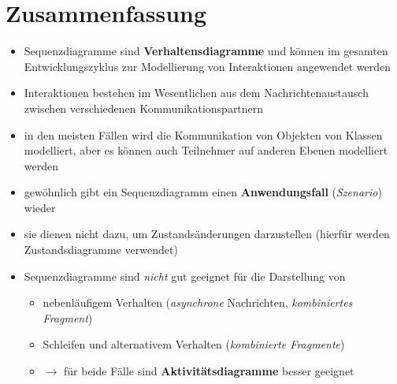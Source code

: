 \section{Zusammenfassung}


\begin{itemize}
    \item Sequenzdiagramme sind \textbf{Verhaltensdiagramme}
    und können im gesamten Entwicklungszyklus zur Modellierung von Interaktionen angewendet werden
    \item Interaktionen bestehen im Wesentlichen aus dem Nachrichtenaustausch zwischen verschiedenen Kommunikationspartnern
    \item in den meisten Fällen wird die Kommunikation von Objekten von Klassen modelliert, aber es können auch Teilnehmer auf anderen Ebenen modelliert werden
    \item gewöhnlich gibt ein Sequenzdiagramm einen \textbf{Anwendungsfall} (\textit{Szenario}) wieder
    \item sie dienen nicht dazu, um Zustandsänderungen darzustellen (hierfür werden Zustandsdiagramme verwendet)
    \item Sequenzdiagramme sind \textit{nicht} gut geeignet für die Darstellung von
    \begin{itemize}
        \item nebenläufigem Verhalten (\textit{asynchrone} Nachrichten, \textit{kombiniertes Fragment})
        \item Schleifen und alternativem Verhalten (\textit{kombinierte Fragmente})
        \item[] $\rightarrow$  für beide Fälle sind \textbf{Aktivitätsdiagramme} besser geeignet
    \end{itemize}
\end{itemize}